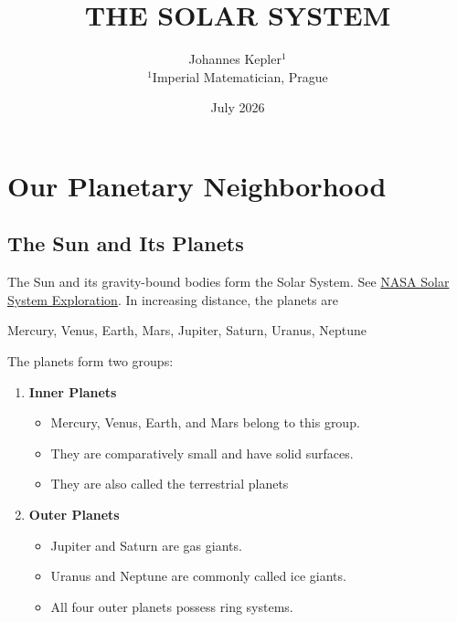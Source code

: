 \documentclass{article}
\title{\textsc{THE SOLAR SYSTEM}}
\author[1]{Johannes Kepler$^1$ \\ $^1$Imperial Matematician, Prague}
\date{July 2026}
\begin{document}
\maketitle
\tableofcontents
\newpage

\section{Our Planetary Neighborhood}

\subsection{The Sun and Its Planets}

The Sun and its gravity-bound bodies form the Solar System\cite{nasa_planets}. See \href{https://science.nasa.gov/solar-system/}{NASA
Solar System Exploration}. In increasing distance, the planets are

Mercury, Venus, Earth, Mars, Jupiter, Saturn, Uranus, Neptune

The planets form two groups:

\begin{enumerate}[label={I}]
    \item \textbf{Inner Planets}
        \begin{itemize}
            \item[$\dagger$] Mercury, Venus, Earth, and Mars belong to this group.
            \item[$\dagger$] They are comparatively small and have solid surfaces.
            \item[$\dagger$]  They are also called the terrestrial planets
        \end{itemize}
    \item \textbf{Outer Planets}
        \begin{itemize}
            \item[$\dagger$] Jupiter and Saturn are gas giants.
            \item[$\dagger$] Uranus and Neptune are commonly called ice giants.
            \item[$\dagger$]  All four outer planets possess ring systems.
        \end{itemize}
\end{enumerate}
\end{document}
